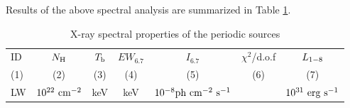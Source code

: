 \documentclass[fleqn,usenatbib]{mnras}
\begin{document}
Results of the above spectral analysis are summarized in Table \ref{tab:spec}.
\begin{table}
\centering
\begin{threeparttable}
\caption{X-ray spectral properties of the periodic sources \label{tab:spec}}
\begin{spacing}{1.19}

\begin{tabular}{lcccccc}
\hline
\hline
ID & $N_{\rm H}$ & $T_{\rm b}$ &  $EW_{6.7}$ &$I_{6.7}$ & $\chi^2$/d.o.f & $L_{\rm 1-8}$ 
\\
(1) & (2) & (3) & (4) & (5) & (6) & (7)
\\
LW & $10^{22}\rm~cm^{-2}$ & keV & keV & $\rm 10^{-8} ph~ cm^{-2}~s^{-1} $ & & $10^{31}\rm~erg~s^{-1}$ 
\\
\hline


\end{tabular}
\end{spacing}
\end{threeparttable}
\end{table}
\end{document}
